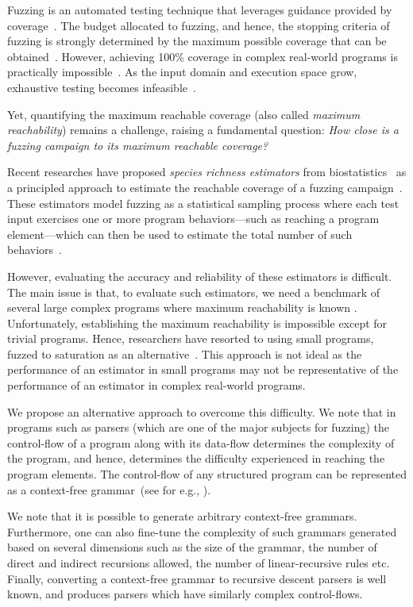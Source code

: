 \documentclass[conference,anonymous,review]{IEEEtran}
\begin{document}
Fuzzing is an automated testing technique that leverages guidance provided
by coverage~\cite{boehme2016coverage}.
The budget allocated to fuzzing, and hence, the stopping criteria
of fuzzing is strongly determined by the maximum possible coverage that can
be obtained~\cite{fell2017review}.
%
However, achieving 100\% coverage in complex real-world programs is practically impossible~\cite{horgan1994achieving}. 
As the input domain and execution space grow, exhaustive testing becomes infeasible~\cite{knight1996exhaustive}.

Yet, quantifying the maximum reachable coverage (also called \emph{maximum reachability}) remains a challenge, raising a fundamental question:
\emph{How close is a fuzzing campaign to its maximum reachable coverage?}

Recent researches have proposed \emph{species richness estimators} from
biostatistics~\cite{chao2016species} as a principled approach to estimate
the reachable coverage of a fuzzing campaign~\cite{boehme2018stads}.
These estimators model fuzzing as a statistical sampling process where
each test input exercises one or more program behaviors---such as reaching
a program element---which can then be used to estimate the total number of such behaviors~\cite{boehme2018stads}.

However, evaluating the accuracy and reliability
of these estimators is difficult. The main issue is that, to evaluate such
estimators, we need a benchmark of several large complex programs where
maximum reachability is known \cite{liyanage2021security}. Unfortunately, establishing the maximum
reachability is impossible except for trivial programs. Hence, researchers have resorted to using small programs, fuzzed to saturation as an alternative~\cite{liyanage2023reachable}.
This approach is not ideal as the performance of an estimator in small  
programs may not be representative of the performance of an estimator in complex
real-world programs.

We propose an alternative approach to overcome this difficulty. We note that
in programs such as parsers (which are one of the major subjects for fuzzing)
the control-flow of a program along with its data-flow determines the
complexity of the program, and hence, determines the difficulty
experienced in reaching the program elements. The control-flow of any
structured program can be represented as a context-free
grammar~(see for e.g., ).

We note that it is possible to generate arbitrary
context-free grammars. Furthermore, one can also fine-tune the complexity
of such grammars generated based on several dimensions such as the size
of the grammar, the number of direct and indirect recursions allowed, the
number of linear-recursive rules etc.
Finally, converting a context-free grammar to recursive descent
parsers is well known, and produces parsers which have similarly complex
control-flows.
\end{document}
